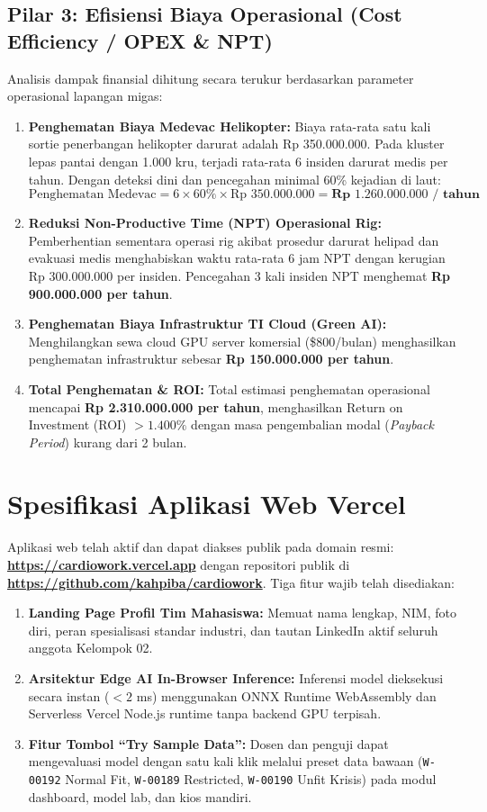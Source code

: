 \documentclass[a4paper,11pt]{article}
\begin{document}
\subsection{Pilar 3: Efisiensi Biaya Operasional (Cost Efficiency / OPEX \& NPT)}
Analisis dampak finansial dihitung secara terukur berdasarkan parameter operasional lapangan migas:
\begin{enumerate}[leftmargin=*]
    \item \textbf{Penghematan Biaya Medevac Helikopter:}
    Biaya rata-rata satu kali sortie penerbangan helikopter darurat adalah Rp 350.000.000. Pada kluster lepas pantai dengan 1.000 kru, terjadi rata-rata 6 insiden darurat medis per tahun. Dengan deteksi dini dan pencegahan minimal 60\% kejadian di laut:
    $$\text{Penghematan Medevac} = 6 \times 60\% \times \text{Rp } 350.000.000 = \mathbf{\text{Rp } 1.260.000.000 \text{ / tahun}}$$
    \item \textbf{Reduksi Non-Productive Time (NPT) Operasional Rig:}
    Pemberhentian sementara operasi rig akibat prosedur darurat helipad dan evakuasi medis menghabiskan waktu rata-rata 6 jam NPT dengan kerugian Rp 300.000.000 per insiden. Pencegahan 3 kali insiden NPT menghemat \textbf{Rp 900.000.000 per tahun}.
    \item \textbf{Penghematan Biaya Infrastruktur TI Cloud (Green AI):}
    Menghilangkan sewa cloud GPU server komersial (\$800/bulan) menghasilkan penghematan infrastruktur sebesar \textbf{Rp 150.000.000 per tahun}.
    \item \textbf{Total Penghematan \& ROI:}
    Total estimasi penghematan operasional mencapai \textbf{Rp 2.310.000.000 per tahun}, menghasilkan Return on Investment (ROI) $> 1.400\%$ dengan masa pengembalian modal (\textit{Payback Period}) kurang dari 2 bulan.
\end{enumerate}

\section{Spesifikasi Aplikasi Web Vercel}
Aplikasi web telah aktif dan dapat diakses publik pada domain resmi: \textbf{\href{https://cardiowork.vercel.app}{https://cardiowork.vercel.app}} dengan repositori publik di \textbf{\href{https://github.com/kahpiba/cardiowork}{https://github.com/kahpiba/cardiowork}}. Tiga fitur wajib telah disediakan:
\begin{enumerate}[leftmargin=*]
    \item \textbf{Landing Page Profil Tim Mahasiswa:} Memuat nama lengkap, NIM, foto diri, peran spesialisasi standar industri, dan tautan LinkedIn aktif seluruh anggota Kelompok 02.
    \item \textbf{Arsitektur Edge AI In-Browser Inference:} Inferensi model dieksekusi secara instan ($< 2$ ms) menggunakan ONNX Runtime WebAssembly dan Serverless Vercel Node.js runtime tanpa backend GPU terpisah.
    \item \textbf{Fitur Tombol ``Try Sample Data'':} Dosen dan penguji dapat mengevaluasi model dengan satu kali klik melalui preset data bawaan (\texttt{W-00192} Normal Fit, \texttt{W-00189} Restricted, \texttt{W-00190} Unfit Krisis) pada modul dashboard, model lab, dan kios mandiri.
\end{enumerate}
\end{document}
